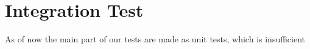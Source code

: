 \section{Integration Test}
As of now the main part of our tests are made as unit tests, which is insufficient 